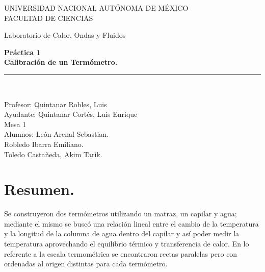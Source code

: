 \documentclass{article}
\begin{document}
\begin{titlepage}
\begin{center}
\begin{figure}
\end{figure}
\vspace*{0.5in}
UNIVERSIDAD NACIONAL AUTÓNOMA DE MÉXICO\\
\vspace*{0.2in}
FACULTAD DE CIENCIAS \\
\vspace*{0.5in}
\begin{large}
Laboratorio de Calor, Ondas y Fluidos\\
\end{large}
\vspace*{0.2in}
\begin{Large}
\textbf{Práctica 1} \\
\textbf{Calibración de un Termómetro.} \\
\end{Large}
\vspace*{0.3in}
\vspace*{0.3in}
\rule{80mm}{0.1mm}\\
\vspace*{0.1in}
\begin{large}
Profesor:  Quintanar Robles, Luis  \\
Ayudante: Quintanar Cortés, Luis Enrique \\
Mesa 1\\
Alumnos: León Arenal Sebastian.\\
Robledo Ibarra Emiliano. \\
Toledo Castañeda, Akim Tarik.\\


\end{large}
\end{center}
\end{titlepage}
\section*{Resumen.}
Se construyeron dos termómetros utilizando un matraz, un capilar y agua; mediante el mismo se buscó una relación lineal entre el cambio de la temperatura y la longitud de la columna de agua dentro del capilar y así poder medir la temperatura aprovechando el equilibrio térmico y transferencia de calor. En lo referente a la escala termométrica se encontraron rectas paralelas pero con ordenadas al origen distintas para cada termómetro.
\end{document}
